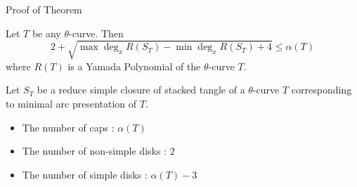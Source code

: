 

\begin{frame}{Proof of Theorem}
	\begin{thm}
	Let $T$ be any $\theta$-curve.
	Then
	\[
		2 + \sqrt{\max\deg_xR(S_T) - \min\deg_xR(S_T) + 4} \le \alpha(T)
	\]
	where $R(T)$ is a Yamada Polynomial of the $\theta$-curve $T$.
	\end{thm}	

	\mypf

	Let $S_T$ be a reduce simple closure of stacked tangle of a $\theta$-curve $T$
	corresponding to minimal arc presentation of $T$.

	\begin{itemize}
		\item The number of caps : $\alpha(T)$
		\item The number of non-simple disks : $2$
		\item The number of simple disks : $\alpha(T)-3$
	\end{itemize}
\end{frame}


